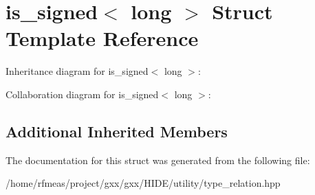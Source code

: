 \hypertarget{structis__signed_3_01long_01_4}{}\section{is\+\_\+signed$<$ long $>$ Struct Template Reference}
\label{structis__signed_3_01long_01_4}


Inheritance diagram for is\+\_\+signed$<$ long $>$\+:


Collaboration diagram for is\+\_\+signed$<$ long $>$\+:
\subsection*{Additional Inherited Members}


The documentation for this struct was generated from the following file\+:\begin{DoxyCompactItemize}
\item 
/home/rfmeas/project/gxx/gxx/\+H\+I\+D\+E/utility/type\+\_\+relation.\+hpp\end{DoxyCompactItemize}
